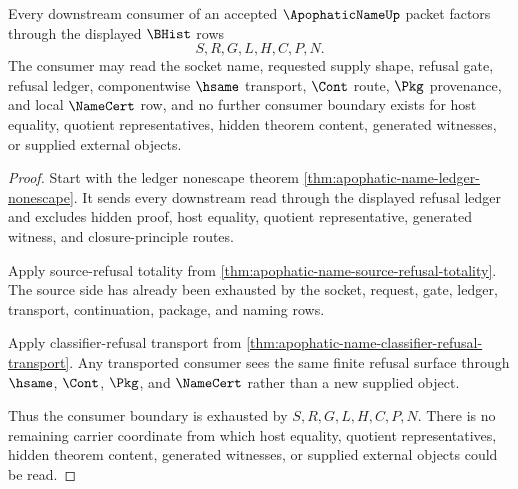 \begin{theorem}
\label{thm:apophatic-name-consumer-boundary-exhaustion}
Every downstream consumer of an accepted $\ApophaticNameUp$ packet factors through the displayed $\BHist$ rows
$$
S,R,G,L,H,C,P,N.
$$
The consumer may read the socket name, requested supply shape, refusal gate, refusal ledger, componentwise $\hsame$ transport, $\Cont$ route, $\Pkg$ provenance, and local $\NameCert$ row, and no further consumer boundary exists for host equality, quotient representatives, hidden theorem content, generated witnesses, or supplied external objects.
\end{theorem}
\begin{proof}
Start with the ledger nonescape theorem \autoref{thm:apophatic-name-ledger-nonescape}. It sends every downstream read through the displayed refusal ledger and excludes hidden proof, host equality, quotient representative, generated witness, and closure-principle routes.

Apply source-refusal totality from \autoref{thm:apophatic-name-source-refusal-totality}. The source side has already been exhausted by the socket, request, gate, ledger, transport, continuation, package, and naming rows.

Apply classifier-refusal transport from \autoref{thm:apophatic-name-classifier-refusal-transport}. Any transported consumer sees the same finite refusal surface through $\hsame$, $\Cont$, $\Pkg$, and $\NameCert$ rather than a new supplied object.

Thus the consumer boundary is exhausted by $S,R,G,L,H,C,P,N$. There is no remaining carrier coordinate from which host equality, quotient representatives, hidden theorem content, generated witnesses, or supplied external objects could be read.
\end{proof}

